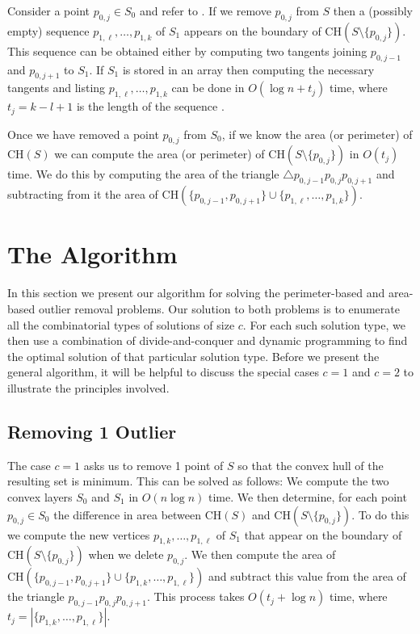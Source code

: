 \documentclass[lotsofwhite]{patmorin}
\newcommand{\ch}{\mathrm{CH}}
\begin{document}
Consider a point $p_{0,j}\in S_0$ and refer to .
If we remove $p_{0,j}$ from $S$ then a (possibly empty) sequence
$p_{1,\ell},\ldots,p_{1,k}$ of $S_1$ appears on the boundary of
$\ch(S\setminus\{p_{0,j}\})$.  This sequence can be obtained either by
computing two tangents joining $p_{0,j-1}$ and $p_{0,j+1}$ to $S_1$.
If $S_1$ is stored in an array then computing the necessary tangents
and listing $p_{1,\ell},\ldots,p_{1,k}$ can be done in $O(\log n+t_j)$
time, where $t_j=k-l+1$ is the length of the sequence \cite{X}.

Once we have removed a point $p_{0,j}$ from $S_0$, if we know the area
(or perimeter) of $\ch(S)$ we can compute the area (or perimeter) of
$\ch(S\setminus\{p_{0,j}\})$ in $O(t_j)$ time.  We do this by
computing the area of the triangle $\triangle
p_{0,j-1}p_{0,j}p_{0,j+1}$ and subtracting from it the area of
$\ch(\{p_{0,j-1},p_{0,j+1}\}\cup\{p_{1,\ell},\ldots,p_{1,k}\})$.


\section{The Algorithm}

In this section we present our algorithm for solving the
perimeter-based and area-based outlier removal problems. Our solution
to both problems is to enumerate all the combinatorial types of
solutions of size $c$.  For each such solution type, we then use a
combination of divide-and-conquer and dynamic programming to find the
optimal solution of that particular solution type.  Before we present
the general algorithm, it will be helpful to discuss the special cases
$c=1$ and $c=2$ to illustrate the principles involved.

\subsection{Removing 1 Outlier}

The case $c=1$ asks us to remove 1 point of $S$ so that the convex
hull of the resulting set is minimum.  This can be solved as follows:
We compute the two convex layers $S_0$ and $S_1$ in $O(n\log n)$ time.
We then determine, for each point $p_{0,j}\in S_0$ the difference in
area between $\ch(S)$ and $\ch(S\setminus\{p_{0,j}\})$.  To do this we
compute the new vertices $p_{1,k},\ldots,p_{1,\ell}$ of $S_1$ that
appear on the boundary of $\ch(S\setminus\{p_{0,j}\})$ when we delete
$p_{0,j}$.  We then compute the area of
$\ch(\{p_{0,j-1},p_{0,j+1}\}\cup\{p_{1,k},\ldots,p_{1,\ell}\})$ and
subtract this value from the area of the triangle
$p_{0,j-1}p_{0,j}p_{0,j+1}$.   This process takes $O(t_j+\log n)$
time, where $t_j=|\{p_{1,k},\ldots,p_{1,\ell}\}|$.
\end{document}
